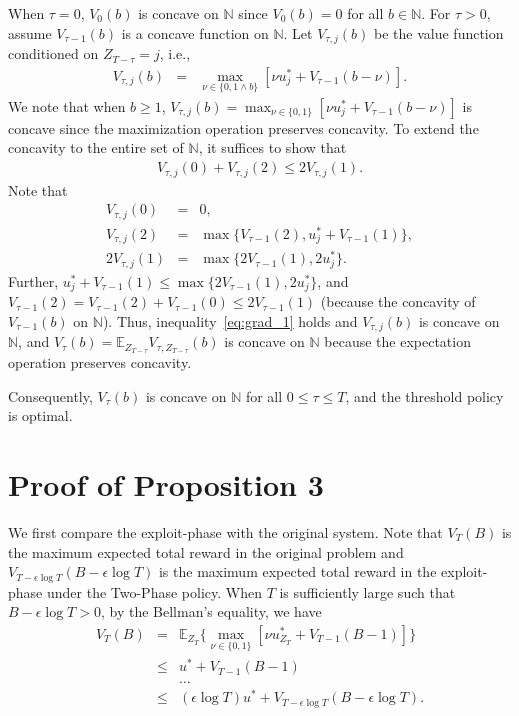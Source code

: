 When $\tau = 0$,
$V_0(b)$ is concave on $\mathbb{N}$ since $V_0 (b) = 0$ for all $b \in \mathbb{N}$. For $\tau > 0$, assume $V_{\tau-1}(b)$ is a concave function on $\mathbb{N}$. Let $V_{\tau,j}(b)$ be the value function conditioned on $Z_{T-\tau} = j$, i.e.,
\begin{eqnarray}
V_{\tau,j}(b) &=& \max_{\nu \in \{0, 1\land b\}} [\nu u_j^* + V_{\tau-1}(b - \nu)].
\end{eqnarray}
We note that when $b \geq 1$, $V_{\tau,j}(b) = \max_{\nu \in \{0, 1\}} [\nu u_j^* + V_{\tau-1}(b - \nu)]$ is concave since the maximization operation preserves concavity. To extend the concavity to the entire set of $\mathbb{N}$, it suffices to show that
\begin{eqnarray}\label{eq:grad_1}
V_{\tau,j}(0) + V_{\tau,j}(2) \leq 2V_{\tau,j}(1).
\end{eqnarray}
Note that
\begin{eqnarray}
V_{\tau,j}(0) &=& 0, \nonumber \\
V_{\tau,j}(2) &=& \max\{V_{\tau-1}(2), u_j^* + V_{\tau-1}(1)\}, \nonumber\\
2V_{\tau,j}(1) & = & \max\{2V_{\tau-1}(1), 2u_j^*  \} \nonumber.
\end{eqnarray}
Further, $u_j^* + V_{\tau-1}(1) \leq \max\{2V_{\tau-1}(1), 2u_j^*  \}$, and $V_{\tau-1}(2) = V_{\tau-1}(2) + V_{\tau-1}(0)\leq 2V_{\tau-1}(1)$ (because the concavity of $V_{\tau-1}(b)$ on $\mathbb{N}$). Thus, inequality~\eqref{eq:grad_1} holds and $V_{\tau,j}(b)$ is concave on $\mathbb{N}$, and $V_{\tau}(b) = \mathbb{E}_{Z_{T-\tau}}V_{\tau,Z_{T-\tau}}(b)$ is concave on  $\mathbb{N}$ because the expectation operation preserves concavity.

Consequently, $V_{\tau}(b)$ is concave on $\mathbb{N}$ for all $0 \leq \tau \leq T$, and the threshold policy is optimal.

\section{Proof of Proposition 3}\label{app:proof_opt_twophase_policy}

We first compare the exploit-phase with the original system. Note that $V_T(B)$ is the maximum expected total reward in the original problem and  $V_{T-\epsilon \log T}(B - \epsilon \log T)$ is the maximum expected total reward in the exploit-phase under the Two-Phase policy. When $T$ is sufficiently large such that $B - \epsilon \log T > 0$, by the Bellman's equality, we have
\begin{eqnarray}
V_{T}(B) &=& \mathbb{E}_{Z_{T}}\big\{\max_{\nu \in \{0, 1\}} [\nu u_{Z_{T}}^* + V_{T-1}(B - 1)] \big\}\nonumber \\
&\leq& u^* + V_{T-1}(B-1) \nonumber \\
&& \ldots \nonumber \\
&\leq & (\epsilon \log T)u^* + V_{T-\epsilon \log T}(B - \epsilon \log T).
\end{eqnarray}

